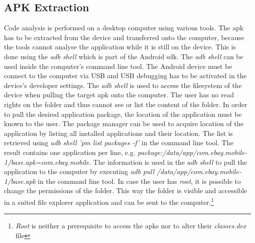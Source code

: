 \newpage
\subsection{APK Extraction} \label{subsection:tools-apk}
Code analysis is performed on a desktop computer using various tools.
The \gls{apk} has to be extracted from the device and transferred onto the computer, because the tools cannot analyse the application while it is still on the device.
This is done using the \textit{adb shell} which is part of the Android \gls{sdk}.
\newline
The \textit{adb shell} can be used inside the computer’s command line tool.
The Android device must be connect to the computer via USB and USB debugging has to be activated in the device’s developer settings.
The \textit{adb shell} is used to access the filesystem of the device when pulling the target \gls{apk} onto the computer.
The user has no read rights on the folder and thus cannot see or list the content of the folder.
In order to pull the desired application package, the location of the application must be known to the user.
The package manager can be used to acquire location of the application by listing all installed applications and their location.
The list is retrieved using \textit{adb shell 'pm list packages -f'} in the command line tool.
The result contains one application per line, e.g. \textit{package:/data/app/com.ebay.mobile-1/base.apk=com.ebay.mobile}.
The information is used in the \textit{adb shell} to pull the application to the computer by executing \textit{adb pull /data/app/com.ebay.mobile-1/base.apk} in the command line tool.
\newline
In case the user has \textit{root}, it is possible to change the permissions of the folder.
This way the folder is visible and accessible in a suited file explorer application and can be sent to the computer.\footnote[1]{\textit{Root} is neither a prerequisite to access the \gls{apk}s nor to alter their \textit{classes.dex} file}
